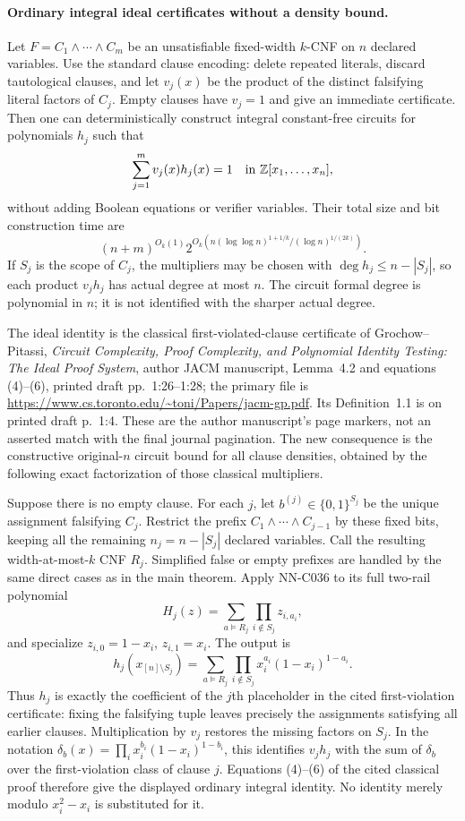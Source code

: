 \paragraph{Ordinary integral ideal certificates without a density bound.}
Let $F=C_1\wedge\cdots\wedge C_m$ be an unsatisfiable fixed-width
$k$-CNF on $n$ declared variables.  Use the standard clause encoding:
delete repeated literals, discard tautological clauses, and let
$v_j(x)$ be the product of the distinct falsifying literal factors
of $C_j$.  Empty clauses have $v_j=1$ and give an immediate
certificate.  Then one can deterministically construct integral
constant-free circuits for polynomials $h_j$ such that
\[
                 \sum_{j=1}^m v_j(x)h_j(x)=1
                              \quad\hbox{in }\mathbb Z[x_1,\ldots,x_n],
\]
without adding Boolean equations or verifier variables.  Their
total size and bit construction time are
\[
 (n+m)^{O_k(1)}
  2^{O_k(n(\log\log n)^{1+1/k}/(\log n)^{1/(2k)})}.
\]
If $S_j$ is the scope of $C_j$, the multipliers may be chosen
with $\deg h_j\le n-|S_j|$, so each product $v_jh_j$ has actual
degree at most $n$.  The circuit formal degree is polynomial
in $n$; it is not identified with the sharper actual degree.

The ideal identity is the classical first-violated-clause
certificate of Grochow--Pitassi, \emph{Circuit Complexity, Proof
Complexity, and Polynomial Identity Testing: The Ideal Proof
System}, author JACM manuscript, Lemma~4.2 and equations
(4)--(6), printed draft pp.~1:26--1:28; the primary file is
\url{https://www.cs.toronto.edu/~toni/Papers/jacm-gp.pdf}.
Its Definition~1.1 is on printed draft p.~1:4.  These are
the author manuscript's page markers, not an asserted match
with the final journal pagination.  The new consequence is
the constructive original-$n$ circuit bound for all clause
densities, obtained by the following exact factorization of
those classical multipliers.

Suppose there is no empty clause.  For each $j$, let
$b^{(j)}\in\{0,1\}^{S_j}$ be the unique assignment falsifying
$C_j$.  Restrict the prefix $C_1\wedge\cdots\wedge C_{j-1}$
by these fixed bits, keeping all the remaining $n_j=n-|S_j|$
declared variables.  Call the resulting width-at-most-$k$
CNF $R_j$.  Simplified false or empty prefixes are handled
by the same direct cases as in the main theorem.  Apply
NN-C036 to its full two-rail polynomial
\[
 H_j(z)=\sum_{a\models R_j}\prod_{i\notin S_j}z_{i,a_i},
\]
and specialize $z_{i,0}=1-x_i$, $z_{i,1}=x_i$.  The output is
\[
 h_j(x_{[n]\setminus S_j})=
 \sum_{a\models R_j}\prod_{i\notin S_j}
                       x_i^{a_i}(1-x_i)^{1-a_i}.
\]
Thus $h_j$ is exactly the coefficient of the $j$th placeholder
in the cited first-violation certificate: fixing the falsifying
tuple leaves precisely the assignments satisfying all earlier
clauses.  Multiplication by $v_j$ restores the missing factors
on $S_j$.  In the notation
$\delta_b(x)=\prod_i x_i^{b_i}(1-x_i)^{1-b_i}$, this identifies
$v_jh_j$ with the sum of $\delta_b$ over the first-violation
class of clause $j$.  Equations (4)--(6) of the cited classical
proof therefore give the displayed ordinary integral identity.
No identity merely modulo $x_i^2-x_i$ is substituted for it.

